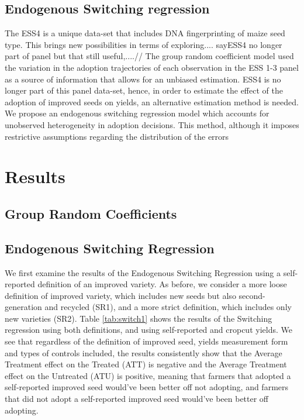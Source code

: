 \documentclass{article}
\begin{document}
\subsection{Endogenous Switching regression}
The ESS4 is a unique data-set that includes DNA fingerprinting of maize seed type. This brings new possibilities in terms of exploring.... sayESS4 no longer part of panel but that still useful,....//
The group random coefficient model used the variation in the adoption trajectories of each observation in the ESS 1-3 panel as a source of information that allows for an unbiased estimation. ESS4 is no longer part of this panel data-set, hence, in order to estimate the effect of the adoption of improved seeds on yields, an alternative estimation method is needed. We propose an endogenous switching regression model which accounts for unobserved heterogeneity in adoption decisions. This method, although it imposes restrictive assumptions regarding the distribution of the errors 


\section{Results}



\subsection{Group Random Coefficients}


\resizebox{1\textwidth}{!}{

}

\resizebox{1\textwidth}{!}{
\centering
% 


}
% 


\subsection{Endogenous Switching Regression}

We first examine the results of the Endogenous Switching Regression using a self-reported definition of an improved variety. As before, we consider a more loose definition of improved variety, which includes new seeds but also second-generation and recycled (SR1), and a more strict definition, which includes only new varieties (SR2). Table \ref{tab:switch1} shows the results of the Switching regression using both definitions, and using self-reported and cropcut yields. We see that regardless of the definition of improved seed, yields measurement form and types of controls included, the results consistently show that the Average Treatment effect on the Treated (ATT) is negative and the Average Treatment effect on the Untreated (ATU) is positive, meaning that farmers that adopted a self-reported improved seed would've been better off not adopting, and farmers that did not adopt a self-reported improved seed would've been better off adopting. 
\end{document}
